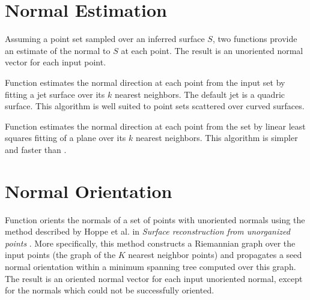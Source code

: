 \section{Normal Estimation}

Assuming a point set sampled over an inferred surface $S$, two functions provide an estimate of the normal to $S$ at each point. The result is an unoriented normal vector for each input point.

Function  estimates the normal direction at each point from the input set by fitting a jet surface over its $k$ nearest neighbors. The default jet is a quadric surface. This algorithm is well suited to point sets scattered over curved surfaces.

Function  estimates the normal direction at each point from the set by linear least squares fitting of a plane over its $k$ nearest neighbors. This algorithm is simpler and faster than .


\section{Normal Orientation}

Function  orients the normals of a set of points with unoriented normals using the method described by Hoppe et al. in \emph{Surface reconstruction from unorganized points} \cite{cgal:hddms-srup-92}. More specifically, this method constructs a Riemannian graph over the input points (the graph of the $K$ nearest neighbor points) and propagates a seed normal orientation within a minimum spanning tree computed over this graph. The result is an oriented normal vector for each input unoriented normal, except for the normals which could not be successfully oriented.

